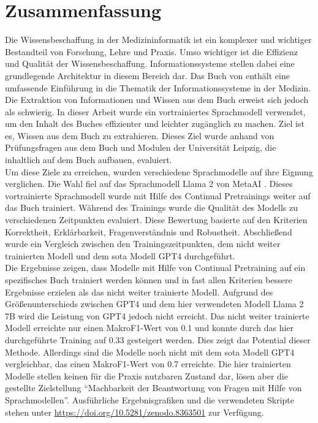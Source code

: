 \chapter*{Zusammenfassung}
Die Wissensbeschaffung in der Medizininformatik ist ein komplexer und wichtiger Bestandteil von Forschung, Lehre und Praxis.
Umso wichtiger ist die Effizienz und Qualität der Wissensbeschaffung.
Informationssysteme stellen dabei eine grundlegende Architektur in diesem Bereich dar.
Das Buch  von \citet{bb} enthält eine umfassende Einführung in die Thematik der Informationssysteme in der Medizin.
Die Extraktion von Informationen und Wissen aus dem Buch erweist sich jedoch als schwierig.
In dieser Arbeit wurde ein vortrainiertes Sprachmodell verwendet, um den Inhalt des Buches effizienter und leichter zugänglich zu machen.
Ziel ist es, Wissen aus dem Buch zu extrahieren.
Dieses Ziel wurde anhand von Prüfungsfragen aus dem Buch und Modulen der Universität Leipzig, die inhaltlich auf dem Buch aufbauen, evaluiert.\\

Um diese Ziele zu erreichen, wurden verschiedene Sprachmodelle auf ihre Eignung verglichen.
Die Wahl fiel auf das Sprachmodell Llama 2 von MetaAI \citep{llama2}.
Dieses vortrainierte Sprachmodell wurde mit Hilfe des Continual Pretrainings weiter auf das Buch trainiert.
Während des Trainings wurde die Qualität des Modells zu verschiedenen Zeitpunkten evaluiert.
Diese Bewertung basierte auf den Kriterien Korrektheit, Erklärbarkeit, Fragenverständnis und Robustheit.
Abschließend wurde ein Vergleich zwischen den Trainingszeitpunkten, dem nicht weiter trainierten Modell und dem \ac{sota} Modell GPT4 durchgeführt.\\

\enlargethispage{0.5\baselineskip}
Die Ergebnisse zeigen, dass Modelle mit Hilfe von Continual Pretraining auf ein spezifisches Buch trainiert werden können und in fast allen Kriterien bessere Ergebnisse erzielen als das nicht weiter trainierte Modell.
Aufgrund des Größenunterschieds zwischen GPT4 und dem hier verwendeten Modell Llama 2 7B wird die Leistung von GPT4 jedoch nicht erreicht.
Das nicht weiter trainierte Modell erreichte nur einen MakroF1-Wert von \num{0.1} und konnte durch das hier durchgeführte Training auf \num{0.33} gesteigert werden.
Dies zeigt das Potential dieser Methode.
Allerdings sind die Modelle noch nicht mit dem \ac{sota} Modell GPT4 vergleichbar, das einen MakroF1-Wert von \num{0.7} erreichte.
Die hier trainierten Modelle stellen keinen für die Praxis nutzbaren Zustand dar, lösen aber die gestellte Zielstellung \enquote{Machbarkeit der Beantwortung von Fragen mit Hilfe von Sprachmodellen}.
Ausführliche Ergebnisgrafiken und die verwendeten Skripte stehen unter \url{https://doi.org/10.5281/zenodo.8363501} zur Verfügung.\\


